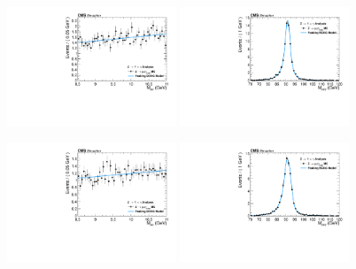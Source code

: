\begin{figure}[!htbp]
\begin{center}
\includegraphics[width=0.45\textwidth]{figures_and_tables/fitPlotFiles2D/ZToUpsilonPhotonSignalAndBackgroundFit/mMuMNU_ZToUpsilon1SPhotonSignalAndBackgroundFit_PeakingBackground_Cat1}\hspace*{1.cm}
\includegraphics[width=0.45\textwidth]{figures_and_tables/fitPlotFiles2D/ZToUpsilonPhotonSignalAndBackgroundFit/mHZ_ZToUpsilon1SPhotonSignalAndBackgroundFit_PeakingBackground_Cat1}\hspace*{1.cm}

\includegraphics[width=0.45\textwidth]{figures_and_tables/fitPlotFiles2D/ZToUpsilonPhotonSignalAndBackgroundFit/mMuMNU_ZToUpsilon1SPhotonSignalAndBackgroundFit_PeakingBackground_Cat2}\hspace*{1.cm}
\includegraphics[width=0.45\textwidth]{figures_and_tables/fitPlotFiles2D/ZToUpsilonPhotonSignalAndBackgroundFit/mHZ_ZToUpsilon1SPhotonSignalAndBackgroundFit_PeakingBackground_Cat2}\hspace*{1.cm}


\end{center}
\end{figure}
